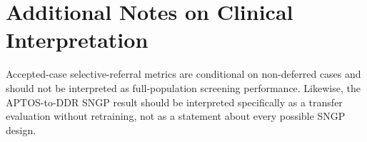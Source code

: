 \documentclass[11pt]{article}
\begin{document}
\appendix
\section{Additional Notes on Clinical Interpretation}
Accepted-case selective-referral metrics are conditional on non-deferred cases and should not be interpreted as full-population screening performance. Likewise, the APTOS-to-DDR SNGP result should be interpreted specifically as a transfer evaluation without retraining, not as a statement about every possible SNGP design.



\end{document}
